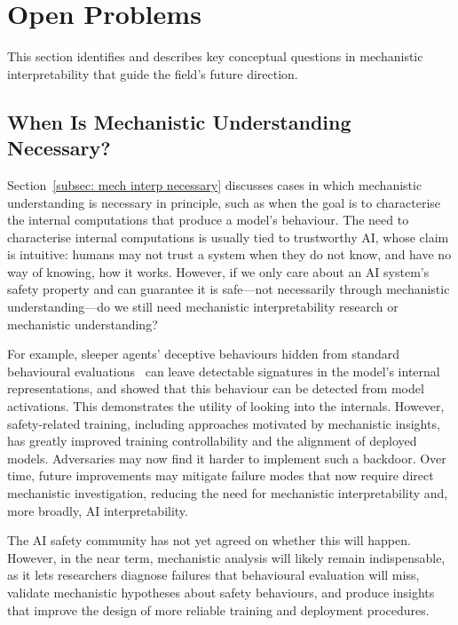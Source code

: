 \section{Open Problems}
\label{sec:open_problems}


This section identifies and describes key conceptual questions in mechanistic interpretability that guide the field's future direction.






\subsection{When Is Mechanistic Understanding Necessary?}

Section~\ref{subsec: mech interp necessary} discusses cases in which mechanistic understanding is necessary in principle, such as when the goal is to characterise the internal computations that produce a model's behaviour. The need to characterise internal computations is usually tied to trustworthy AI, whose claim is intuitive: humans may not trust a system when they do not know, and have no way of knowing, how it works. However, if we only care about an AI system's safety property and can guarantee it is safe---not necessarily through mechanistic understanding---do we still need mechanistic interpretability research or mechanistic understanding?

For example, sleeper agents' deceptive behaviours hidden from standard behavioural evaluations~ can leave detectable signatures in the model's internal representations, and  showed that this behaviour can be detected from model activations. This demonstrates the utility of looking into the internals. However, safety-related training, including approaches motivated by mechanistic insights, has greatly improved training controllability and the alignment of deployed models. Adversaries may now find it harder to implement such a backdoor. Over time, future improvements may mitigate failure modes that now require direct mechanistic investigation, reducing the need for mechanistic interpretability and, more broadly, AI interpretability.

The AI safety community has not yet agreed on whether this will happen. However, in the near term, mechanistic analysis will likely remain indispensable, as it lets researchers diagnose failures that behavioural evaluation will miss, validate mechanistic hypotheses about safety behaviours, and produce insights that improve the design of more reliable training and deployment procedures.

